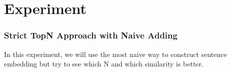 \section{Experiment}
\label{sec:experiment}

\subsubsection*{Strict TopN Approach with Naive Adding}

In this experiment, we will use the most naive way to construct sentence embedding but try to see which N and which similarity is better.


